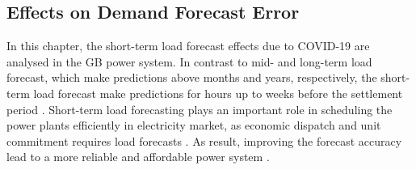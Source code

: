 \documentclass[energies,article,submit,moreauthors,pdftex]{Definitions/mdpi}
\begin{document}



\subsection{Effects on Demand Forecast Error}\label{DemandForecastError}
In this chapter, the short-term load forecast effects due to COVID-19 are analysed in the GB power system. In contrast to mid- and long-term load forecast, which make predictions above months and years, respectively, the short-term load forecast make predictions for hours up to weeks before the settlement period \cite{SahayDayNetwork,Khuntia2016ForecastingReview}. Short-term load forecasting plays an important role in scheduling the power plants efficiently in electricity market, as economic dispatch and unit commitment requires load forecasts \cite{He2020Day-aheadForest}. As result, improving the forecast accuracy lead to a more reliable and affordable power system \cite{SahayDayNetwork}. 
\end{document}
